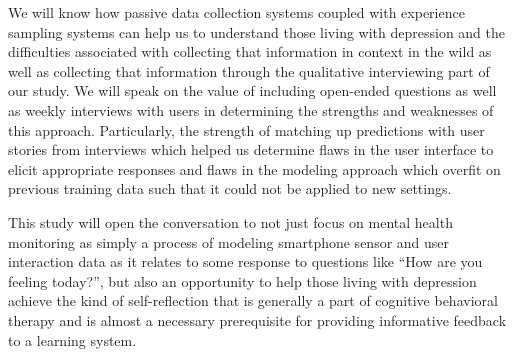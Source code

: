 We will know how passive data collection systems coupled with experience sampling systems can help us to understand those living with depression and the difficulties associated with collecting that information in context in the wild as well as collecting that information through the qualitative interviewing part of our study. We will speak on the value of including open-ended questions as well as weekly interviews with users in determining the strengths and weaknesses of this approach.  Particularly, the strength of matching up predictions with user stories from interviews which helped us determine flaws in the user interface to elicit appropriate responses and flaws in the modeling approach which overfit on previous training data such that it could not be applied to new settings.

This study will open the conversation to not just focus on mental health monitoring as simply a process of modeling smartphone sensor and user interaction data as it relates to some response to questions like “How are you feeling today?”, but also an opportunity to help those living with depression achieve the kind of self-reflection that is generally a part of cognitive behavioral therapy and is almost a necessary prerequisite for providing informative feedback to a learning system.